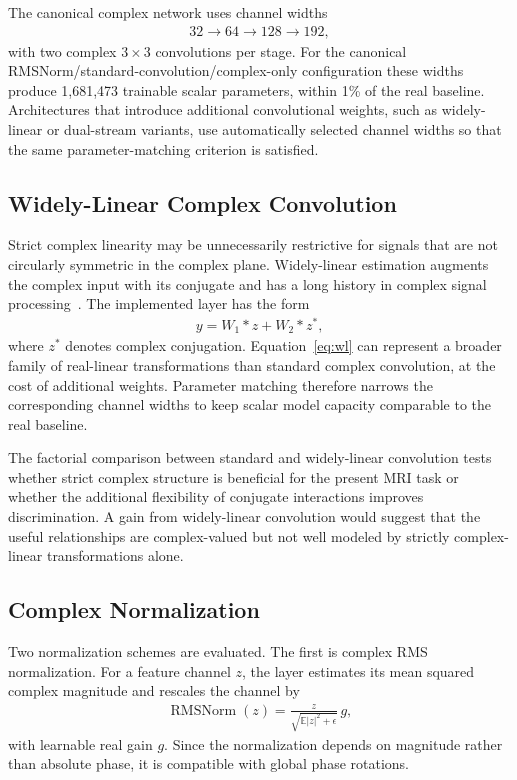 \documentclass[journal]{IEEEtran}
\begin{document}
The canonical complex network uses channel widths
\begin{align}
32 \rightarrow 64 \rightarrow 128 \rightarrow 192,
\end{align}
with two complex $3\times3$ convolutions per stage. For the canonical RMSNorm/standard-convolution/complex-only configuration these widths produce 1,681,473 trainable scalar parameters, within 1\% of the real baseline. Architectures that introduce additional convolutional weights, such as widely-linear or dual-stream variants, use automatically selected channel widths so that the same parameter-matching criterion is satisfied.

\subsection{Widely-Linear Complex Convolution}
Strict complex linearity may be unnecessarily restrictive for signals that are not circularly symmetric in the complex plane. Widely-linear estimation augments the complex input with its conjugate and has a long history in complex signal processing~\cite{Picinbono1995WidelyLinear}. The implemented layer has the form
\begin{align}
y = W_1*z + W_2*z^*,
\label{eq:wl}
\end{align}
where $z^*$ denotes complex conjugation. Equation~\eqref{eq:wl} can represent a broader family of real-linear transformations than standard complex convolution, at the cost of additional weights. Parameter matching therefore narrows the corresponding channel widths to keep scalar model capacity comparable to the real baseline.

The factorial comparison between standard and widely-linear convolution tests whether strict complex structure is beneficial for the present MRI task or whether the additional flexibility of conjugate interactions improves discrimination. A gain from widely-linear convolution would suggest that the useful relationships are complex-valued but not well modeled by strictly complex-linear transformations alone.

\subsection{Complex Normalization}
Two normalization schemes are evaluated. The first is complex RMS normalization. For a feature channel $z$, the layer estimates its mean squared complex magnitude and rescales the channel by
\begin{align}
\operatorname{RMSNorm}(z)
= \frac{z}{\sqrt{\mathbb{E}|z|^2+\epsilon}}\,g,
\end{align}
with learnable real gain $g$. Since the normalization depends on magnitude rather than absolute phase, it is compatible with global phase rotations.
\end{document}
